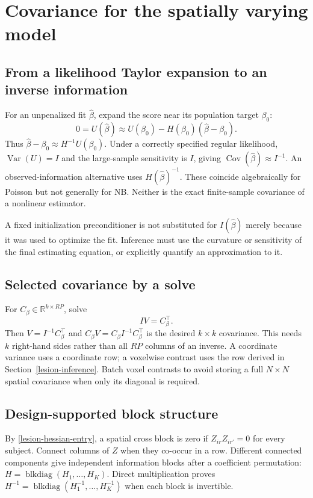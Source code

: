 \documentclass[11pt,a4paper]{article}
\newcommand{\R}{\mathbb R}
\newcommand{\Var}{\operatorname{Var}}
\newcommand{\Cov}{\operatorname{Cov}}
\numberwithin{equation}{section}
\begin{document}
\section{Covariance for the spatially varying model}
\label{lesion-covariance}

\subsection{From a likelihood Taylor expansion to an inverse information}
For an unpenalized fit $\widehat\beta$, expand the score near its
population target $\beta_0$:
\[
 0=U(\widehat\beta)
 \approx U(\beta_0)-H(\beta_0)(\widehat\beta-\beta_0).
\]
Thus $\widehat\beta-\beta_0\approx H^{-1}U(\beta_0)$.
Under a correctly specified regular likelihood,
$\Var(U)=I$ and the large-sample sensitivity is $I$,
giving $\Cov(\widehat\beta)\approx I^{-1}$.
An observed-information alternative uses $H(\widehat\beta)^{-1}$.
These coincide algebraically for Poisson but not generally for NB.
Neither is the exact finite-sample covariance of a nonlinear estimator.

A fixed initialization preconditioner is not substituted for
$I(\widehat\beta)$ merely because it was used to optimize the fit.
Inference must use the curvature or sensitivity of the final
estimating equation, or explicitly quantify an approximation to it.

\subsection{Selected covariance by a solve}
For $C_\beta\in\R^{k\times RP}$, solve
\[
 IV=C_\beta^\top.
\]
Then $V=I^{-1}C_\beta^\top$ and
$C_\beta V=C_\beta I^{-1}C_\beta^\top$ is the desired
$k\times k$ covariance.
This needs $k$ right-hand sides rather than all $RP$ columns
of an inverse. A coordinate variance uses a coordinate row;
a voxelwise contrast uses the row derived in
Section~\ref{lesion-inference}.
Batch voxel contrasts to avoid storing a full $N\times N$
spatial covariance when only its diagonal is required.

\subsection{Design-supported block structure}
By \eqref{lesion-hessian-entry}, a spatial cross block is zero
if $Z_{ir}Z_{ir'}=0$ for every subject.
Connect columns of $Z$ when they co-occur in a row.
Different connected components give independent information blocks
after a coefficient permutation:
$H=\operatorname{blkdiag}(H_1,\ldots,H_K)$.
Direct multiplication proves
$H^{-1}=\operatorname{blkdiag}(H_1^{-1},\ldots,H_K^{-1})$
when each block is invertible.
\end{document}
